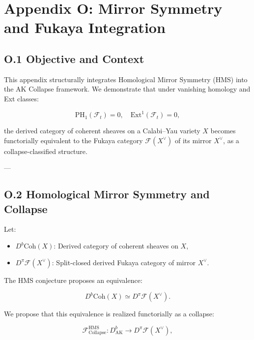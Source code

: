 \documentclass[11pt]{article}
\begin{document}

\section*{Appendix O: Mirror Symmetry and Fukaya Integration}

\subsection*{O.1 Objective and Context}

This appendix structurally integrates Homological Mirror Symmetry (HMS) into the AK Collapse framework. We demonstrate that under vanishing homology and Ext classes:

\[
\mathrm{PH}_1(\mathcal{F}_t) = 0, \quad \mathrm{Ext}^1(\mathcal{F}_t) = 0,
\]

the derived category of coherent sheaves on a Calabi–Yau variety $X$ becomes functorially equivalent to the Fukaya category $\mathcal{F}(X^\vee)$ of its mirror $X^\vee$, as a collapse-classified structure.

---

\subsection*{O.2 Homological Mirror Symmetry and Collapse}

Let:

\begin{itemize}
  \item $D^b\mathrm{Coh}(X)$: Derived category of coherent sheaves on $X$,
  \item $D^\pi\mathcal{F}(X^\vee)$: Split-closed derived Fukaya category of mirror $X^\vee$.
\end{itemize}

The HMS conjecture proposes an equivalence:

\[
D^b\mathrm{Coh}(X) \simeq D^\pi\mathcal{F}(X^\vee).
\]

We propose that this equivalence is realized functorially as a collapse:

\begin{equation}
\mathcal{F}_{\mathrm{Collapse}}^{\mathrm{HMS}} : D^b_{\mathrm{AK}} \to D^\pi\mathcal{F}(X^\vee),
\end{equation}
\end{document}
